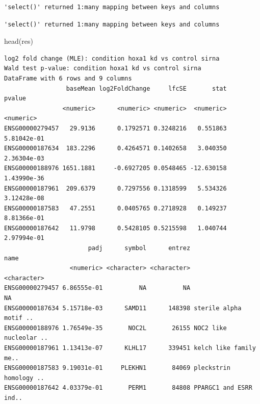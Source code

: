 \documentclass[
  letterpaper,
  DIV=11,
  numbers=noendperiod]{scrartcl}
\newenvironment{Shaded}{\begin{snugshade}}{\end{snugshade}}
\newcommand{\AttributeTok}[1]{\textcolor[rgb]{0.40,0.45,0.13}{#1}}
\newcommand{\FunctionTok}[1]{\textcolor[rgb]{0.28,0.35,0.67}{#1}}
\newcommand{\NormalTok}[1]{\textcolor[rgb]{0.00,0.23,0.31}{#1}}
\newcommand{\OtherTok}[1]{\textcolor[rgb]{0.00,0.23,0.31}{#1}}
\newcommand{\SpecialCharTok}[1]{\textcolor[rgb]{0.37,0.37,0.37}{#1}}
\newcommand{\StringTok}[1]{\textcolor[rgb]{0.13,0.47,0.30}{#1}}
\begin{document}
\begin{verbatim}
'select()' returned 1:many mapping between keys and columns
\end{verbatim}

\begin{Shaded}
\end{Shaded}

\begin{verbatim}
'select()' returned 1:many mapping between keys and columns
\end{verbatim}

\begin{Shaded}
\begin{Highlighting}[]
\FunctionTok{head}\NormalTok{(res)}
\end{Highlighting}
\end{Shaded}

\begin{verbatim}
log2 fold change (MLE): condition hoxa1 kd vs control sirna 
Wald test p-value: condition hoxa1 kd vs control sirna 
DataFrame with 6 rows and 9 columns
                 baseMean log2FoldChange     lfcSE       stat      pvalue
                <numeric>      <numeric> <numeric>  <numeric>   <numeric>
ENSG00000279457   29.9136      0.1792571 0.3248216   0.551863 5.81042e-01
ENSG00000187634  183.2296      0.4264571 0.1402658   3.040350 2.36304e-03
ENSG00000188976 1651.1881     -0.6927205 0.0548465 -12.630158 1.43990e-36
ENSG00000187961  209.6379      0.7297556 0.1318599   5.534326 3.12428e-08
ENSG00000187583   47.2551      0.0405765 0.2718928   0.149237 8.81366e-01
ENSG00000187642   11.9798      0.5428105 0.5215598   1.040744 2.97994e-01
                       padj      symbol      entrez                   name
                  <numeric> <character> <character>            <character>
ENSG00000279457 6.86555e-01          NA          NA                     NA
ENSG00000187634 5.15718e-03      SAMD11      148398 sterile alpha motif ..
ENSG00000188976 1.76549e-35       NOC2L       26155 NOC2 like nucleolar ..
ENSG00000187961 1.13413e-07      KLHL17      339451 kelch like family me..
ENSG00000187583 9.19031e-01     PLEKHN1       84069 pleckstrin homology ..
ENSG00000187642 4.03379e-01       PERM1       84808 PPARGC1 and ESRR ind..
\end{verbatim}
\end{document}
